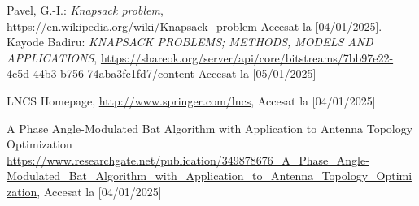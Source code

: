 \documentclass[runningheads]{llncs}
\begin{document}
%
%
%
% 
% 
%
\begin{thebibliography}{8}
Pavel, G.-I.: \emph{Knapsack problem}, \url{https://en.wikipedia.org/wiki/Knapsack_problem} Accesat la [04/01/2025].
Kayode Badiru: \emph{KNAPSACK PROBLEMS; METHODS, MODELS AND APPLICATIONS},
\url{https://shareok.org/server/api/core/bitstreams/7bb97e22-4c5d-44b3-b756-74aba3fc1fd7/content} 
Accesat la [05/01/2025]

LNCS Homepage, \url{http://www.springer.com/lncs}, Accesat la [04/01/2025]

A Phase Angle-Modulated Bat Algorithm with Application to Antenna Topology Optimization
\url{https://www.researchgate.net/publication/349878676_A_Phase_Angle-Modulated_Bat_Algorithm_with_Application_to_Antenna_Topology_Optimization}, Accesat la [04/01/2025]

\end{thebibliography}
\end{document}
